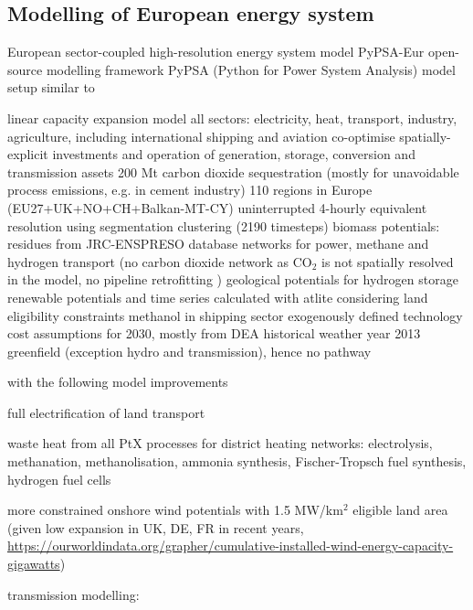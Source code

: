 

\subsection*{Modelling of European energy system}

European sector-coupled high-resolution energy system model PyPSA-Eur \cite{horschPyPSAEurOpen2018a}
open-source modelling framework PyPSA (Python for Power System Analysis) \cite{brownPyPSAPython2018}
model setup similar to \cite{neumannPotentialRole2023}

linear capacity expansion model
all sectors: electricity, heat, transport, industry, agriculture, including international shipping and aviation
co-optimise spatially-explicit investments and operation of generation, storage, conversion and transmission assets
200 Mt carbon dioxide sequestration (mostly for unavoidable process emissions, e.g. in cement industry)
110 regions in Europe (EU27+UK+NO+CH+Balkan-MT-CY) \cite{frysztackiStrongEffect2021}
uninterrupted 4-hourly equivalent resolution using segmentation clustering (2190 timesteps) \cite{hoffmannParetooptimalTemporal2022}
biomass potentials: residues from JRC-ENSPRESO database \cite{ruizENSPRESOOpen2019}
networks for power, methane and hydrogen transport (no carbon dioxide network \cite{hofmannDesigningCO22023} as CO$_2$ is not spatially resolved in the model, no pipeline retrofitting \cite{neumannPotentialRole2023})
geological potentials for hydrogen storage \cite{caglayanTechnicalPotential2020}
renewable potentials and time series calculated with atlite \cite{hofmannAtliteLightweight2021} considering land eligibility constraints
methanol in shipping sector exogenously defined
technology cost assumptions for 2030, mostly from DEA
historical weather year 2013
greenfield (exception hydro and transmission), hence no pathway

with the following model improvements

full electrification of land transport

waste heat from all PtX processes for district heating networks: electrolysis, methanation, methanolisation, ammonia synthesis, Fischer-Tropsch fuel synthesis, hydrogen fuel cells

more constrained onshore wind potentials with 1.5 MW/km$^2$ eligible land area (given low expansion in UK, DE, FR in recent years, \url{https://ourworldindata.org/grapher/cumulative-installed-wind-energy-capacity-gigawatts})

transmission modelling:

